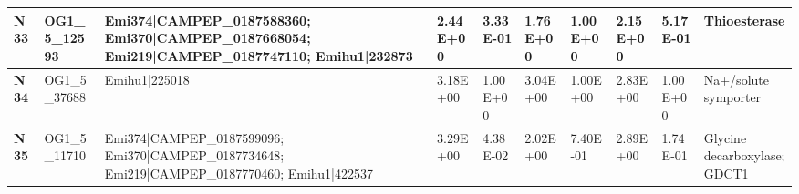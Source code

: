 \begin{landscape}
\begin{center}
\begin{footnotesize}
\begin{longtable}{|p{0.5cm}|p{1.5cm}|p{4cm}|l|l|l|l|l|l|l|}
\textbf{N33} & OG1\_5\_12593 & Emi374|CAMPEP\_0187588360; Emi370|CAMPEP\_0187668054; Emi219|CAMPEP\_0187747110; Emihu1|232873                                                                                                                                                                                                                                                                                                                                                                                                                                                                                                                                           & 2.44E+00  & 3.33E-01 & 1.76E+00  & 1.00E+00 & 2.15E+00  & 5.17E-01 & Thioesterase                                                                 \\ \hline
\textbf{N34} & OG1\_5\_37688 & Emihu1|225018                                                                                                                                                                                                                                                                                                                                                                                                                                                                                                                                                                                                                            & 3.18E+00  & 1.00E+00 & 3.04E+00  & 1.00E+00 & 2.83E+00  & 1.00E+00 & Na+/solute symporter                                                         \\ \hline
\textbf{N35} & OG1\_5\_11710 & Emi374|CAMPEP\_0187599096; Emi370|CAMPEP\_0187734648; Emi219|CAMPEP\_0187770460; Emihu1|422537                                                                                                                                                                                                                                                                                                                                                                                                                                                                                                                                           & 3.29E+00  & 4.38E-02 & 2.02E+00  & 7.40E-01 & 2.89E+00  & 1.74E-01 & Glycine decarboxylase; GDCT1                                                 \\ \hline

\end{longtable}
\end{footnotesize}
\end{center}
\end{landscape}
